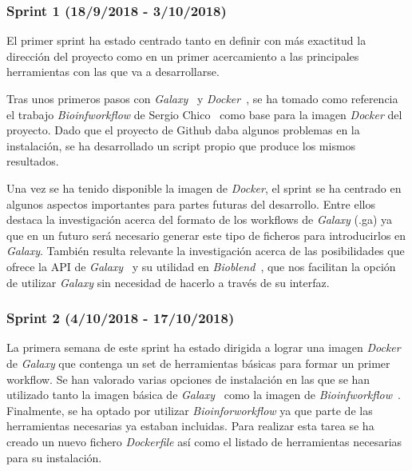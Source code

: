 \subsubsection{Sprint 1 (18/9/2018 - 3/10/2018)}
El primer sprint ha estado centrado tanto en definir con más exactitud la dirección del proyecto como en un primer acercamiento a las principales herramientas con las que va a desarrollarse. 

Tras unos primeros pasos con \textit{Galaxy}~\cite{Galaxy} y \textit{Docker}~\cite{Docker}, se ha tomado como referencia el trabajo \textit{Bioinfworkflow} de Sergio Chico~\cite{Chico2018} como base para la imagen \textit{Docker} del proyecto. Dado que el proyecto de Github daba algunos problemas en la instalación, se ha desarrollado un script propio que produce los mismos resultados.

Una vez se ha tenido disponible la imagen de \textit{Docker}, el sprint se ha centrado en algunos aspectos importantes para partes futuras del desarrollo. Entre ellos destaca la investigación acerca del formato de los workflows de \textit{Galaxy} (.ga) ya que en un futuro será necesario generar este tipo de ficheros para introducirlos en \textit{Galaxy}. También resulta relevante la investigación acerca de las posibilidades que ofrece la API de \textit{Galaxy}~\cite{Galaxy} y su utilidad en \textit{Bioblend}~\cite{GalaxyAPI}, que nos facilitan la opción de utilizar \textit{Galaxy} sin necesidad de hacerlo a través de su interfaz.

\subsubsection{Sprint 2 (4/10/2018 - 17/10/2018)}
La primera semana de este sprint ha estado dirigida a lograr una imagen \textit{Docker} de \textit{Galaxy} que contenga un set de herramientas básicas para formar un primer workflow. Se han valorado varias opciones de instalación en las que se han utilizado tanto la imagen básica de \textit{Galaxy}~\cite{GalaxyDocker} como la imagen de \textit{Bioinfworkflow}~\cite{Chico2018}. Finalmente, se ha optado por utilizar \textit{Bioinforworkflow} ya que parte de las herramientas necesarias ya estaban incluidas. 
Para realizar esta tarea se ha creado un nuevo fichero \textit{Dockerfile} así como el listado de herramientas necesarias para su instalación.

